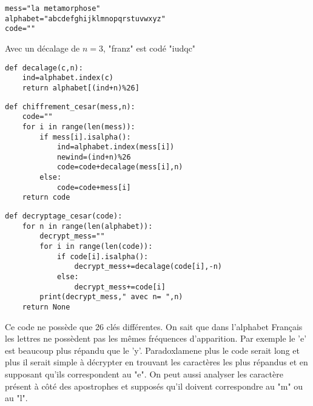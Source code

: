 


\question{}

\begin{center}
\begin{lstlisting}
mess="la metamorphose"
alphabet="abcdefghijklmnopqrstuvwxyz"
code=""
\end{lstlisting}
\end{center}

\question{}

Avec un décalage de $n=3$, "franz" est codé "iudqc"


\question{}

\begin{center}
\begin{lstlisting}
def decalage(c,n):
    ind=alphabet.index(c)
    return alphabet[(ind+n)%26]
\end{lstlisting}
\end{center}


\question{}


\begin{center}
\begin{lstlisting}
def chiffrement_cesar(mess,n):
    code=""
    for i in range(len(mess)):
        if mess[i].isalpha():
            ind=alphabet.index(mess[i])
            newind=(ind+n)%26
            code=code+decalage(mess[i],n)
        else:
            code=code+mess[i]
    return code
\end{lstlisting}
\end{center}

\question{}

\begin{center}
\begin{lstlisting}
def decryptage_cesar(code):
    for n in range(len(alphabet)):
        decrypt_mess=""
        for i in range(len(code)):
            if code[i].isalpha():
                decrypt_mess+=decalage(code[i],-n)
            else:
                decrypt_mess+=code[i]
        print(decrypt_mess," avec n= ",n)
    return None
\end{lstlisting}
\end{center}


%
%

\question{}

Ce code ne possède que 26 clés différentes. On sait que dans l'alphabet Français les lettres ne possèdent pas les mêmes fréquences d'apparition. Par exemple le 'e' est beaucoup plus répandu que le 'y'. Paradoxlamene plus le code serait long et plus il serait simple à décrypter en trouvant les caractères les plus répandus et en supposant qu'ils correspondent au "e". On peut aussi analyser les caractère présent à côté des apostrophes et supposés qu'il doivent correspondre au "m" ou au "l". 

